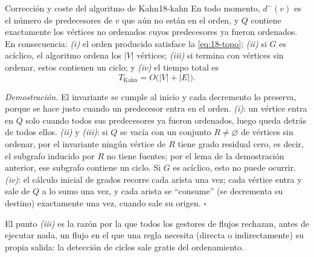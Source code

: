 \begin{teorema}{Corrección y coste del algoritmo de Kahn}{18-kahn}
En todo momento, $d^-(v)$ es el número de predecesores de $v$ que aún no están en el orden, y $Q$ contiene exactamente los vértices no ordenados cuyos predecesores ya fueron ordenados. En consecuencia: \emph{(i)} el orden producido satisface la \cref{eq:18-topo}; \emph{(ii)} si $G$ es acíclico, el algoritmo ordena los $|V|$ vértices; \emph{(iii)} si termina con vértices sin ordenar, estos contienen un ciclo; y \emph{(iv)} el tiempo total es
\begin{equation}\label{eq:18-kahn}
T_{\text{Kahn}} = O\big(|V| + |E|\big).
\end{equation}
\end{teorema}

\begin{simbolos}
\end{simbolos}

\emph{Demostración.} El invariante se cumple al inicio y cada decremento lo preserva, porque se hace justo cuando un predecesor entra en el orden. \emph{(i)}: un vértice entra en $Q$ solo cuando todos sus predecesores ya fueron ordenados, luego queda detrás de todos ellos. \emph{(ii)} y \emph{(iii)}: si $Q$ se vacía con un conjunto $R\neq\varnothing$ de vértices sin ordenar, por el invariante ningún vértice de $R$ tiene grado residual cero, es decir, el subgrafo inducido por $R$ no tiene fuentes; por el lema de la demostración anterior, ese subgrafo contiene un ciclo. Si $G$ es acíclico, esto no puede ocurrir. \emph{(iv)}: el cálculo inicial de grados recorre cada arista una vez; cada vértice entra y sale de $Q$ a lo sumo una vez, y cada arista se ``consume'' (se decrementa su destino) exactamente una vez, cuando sale su origen. \hfill$\square$

El punto \emph{(iii)} es la razón por la que todos los gestores de flujos rechazan, antes de ejecutar nada, un flujo en el que una regla necesita (directa o indirectamente) su propia salida: la detección de ciclos sale gratis del ordenamiento.

